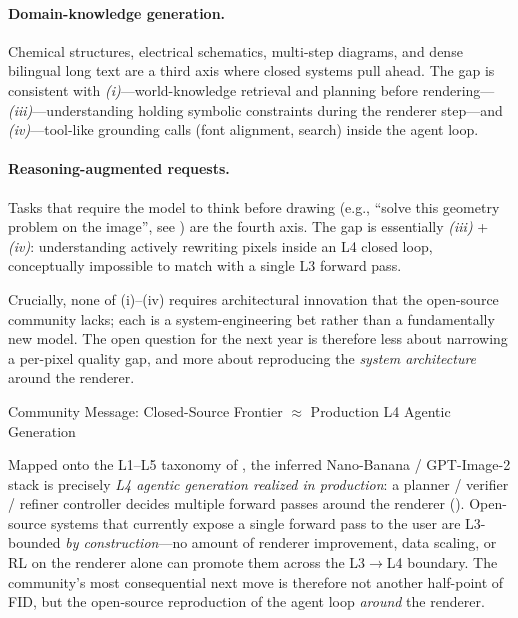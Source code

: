 \paragraph{Domain-knowledge generation.}
Chemical structures, electrical schematics, multi-step diagrams, and dense bilingual long text are a third axis where closed systems pull ahead. The gap is consistent with \emph{(i)}---world-knowledge retrieval and planning before rendering---\emph{(iii)}---understanding holding symbolic constraints during the renderer step---and \emph{(iv)}---tool-like grounding calls (font alignment, search) inside the agent loop.

\paragraph{Reasoning-augmented requests.}
Tasks that require the model to think before drawing (e.g., ``solve this geometry problem on the image'', see ) are the fourth axis. The gap is essentially \emph{(iii)} + \emph{(iv)}: understanding actively rewriting pixels inside an L4 closed loop, conceptually impossible to match with a single L3 forward pass.

Crucially, none of (i)--(iv) requires architectural innovation that the open-source community lacks; each is a system-engineering bet rather than a fundamentally new model. The open question for the next year is therefore less about narrowing a per-pixel quality gap, and more about reproducing the \emph{system architecture} around the renderer.

\begin{highlightbox}{Community Message: Closed-Source Frontier $\approx$ Production L4 Agentic Generation}

Mapped onto the L1--L5 taxonomy of , the inferred Nano-Banana / GPT-Image-2 stack is precisely \emph{L4 agentic generation realized in production}: a planner / verifier / refiner controller decides multiple forward passes around the renderer (). Open-source systems that currently expose a single forward pass to the user are L3-bounded \emph{by construction}---no amount of renderer improvement, data scaling, or RL on the renderer alone can promote them across the L3$\to$L4 boundary. The community's most consequential next move is therefore not another half-point of FID, but the open-source reproduction of the agent loop \emph{around} the renderer.
\end{highlightbox}

